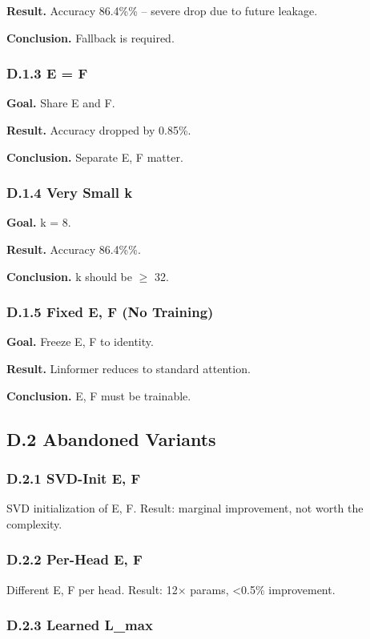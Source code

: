 \textbf{Result.} Accuracy 86.4\%\% -- severe drop due to future leakage.

\textbf{Conclusion.} Fallback is required.

\subsubsection{D.1.3 E = F}

\textbf{Goal.} Share E and F.

\textbf{Result.} Accuracy dropped by 0.85\%.

\textbf{Conclusion.} Separate E, F matter.

\subsubsection{D.1.4 Very Small k}

\textbf{Goal.} k = 8.

\textbf{Result.} Accuracy 86.4\%\%.

\textbf{Conclusion.} k should be $\ge$ 32.

\subsubsection{D.1.5 Fixed E, F (No Training)}

\textbf{Goal.} Freeze E, F to identity.

\textbf{Result.} Linformer reduces to standard attention.

\textbf{Conclusion.} E, F must be trainable.

\subsection{D.2 Abandoned Variants}

\subsubsection{D.2.1 SVD-Init E, F}

SVD initialization of E, F. Result: marginal improvement, not worth the 
complexity.

\subsubsection{D.2.2 Per-Head E, F}

Different E, F per head. Result: 12$\times$ params, <0.5\% improvement.

\subsubsection{D.2.3 Learned L\_max}


